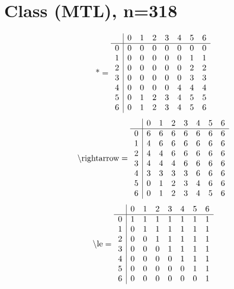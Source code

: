 \documentclass[11pt]{article}
\begin{document}
\section{Class (MTL), n=318}
\[\text{*} = 
\begin{array}{r | r r r r r r r}
 & 0 & 1 & 2 & 3 & 4 & 5 & 6 \\ \hline
0 & 0 & 0 & 0 & 0 & 0 & 0 & 0 \\
1 & 0 & 0 & 0 & 0 & 0 & 1 & 1 \\
2 & 0 & 0 & 0 & 0 & 0 & 2 & 2 \\
3 & 0 & 0 & 0 & 0 & 0 & 3 & 3 \\
4 & 0 & 0 & 0 & 0 & 4 & 4 & 4 \\
5 & 0 & 1 & 2 & 3 & 4 & 5 & 5 \\
6 & 0 & 1 & 2 & 3 & 4 & 5 & 6 \\
\end{array}
\]
\[\text{\textbackslash rightarrow} = 
\begin{array}{r | r r r r r r r}
 & 0 & 1 & 2 & 3 & 4 & 5 & 6 \\ \hline
0 & 6 & 6 & 6 & 6 & 6 & 6 & 6 \\
1 & 4 & 6 & 6 & 6 & 6 & 6 & 6 \\
2 & 4 & 4 & 6 & 6 & 6 & 6 & 6 \\
3 & 4 & 4 & 4 & 6 & 6 & 6 & 6 \\
4 & 3 & 3 & 3 & 3 & 6 & 6 & 6 \\
5 & 0 & 1 & 2 & 3 & 4 & 6 & 6 \\
6 & 0 & 1 & 2 & 3 & 4 & 5 & 6 \\
\end{array}
\]
\[\text{\textbackslash le} = 
\begin{array}{r | r r r r r r r}
 & 0 & 1 & 2 & 3 & 4 & 5 & 6 \\ \hline
0 & 1 & 1 & 1 & 1 & 1 & 1 & 1 \\
1 & 0 & 1 & 1 & 1 & 1 & 1 & 1 \\
2 & 0 & 0 & 1 & 1 & 1 & 1 & 1 \\
3 & 0 & 0 & 0 & 1 & 1 & 1 & 1 \\
4 & 0 & 0 & 0 & 0 & 1 & 1 & 1 \\
5 & 0 & 0 & 0 & 0 & 0 & 1 & 1 \\
6 & 0 & 0 & 0 & 0 & 0 & 0 & 1 \\
\end{array}
\]
\end{document}
